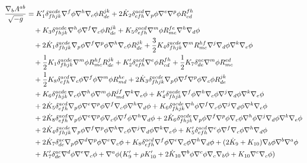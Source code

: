 \begin{equation}\label{nabla-A}
\begin{split}
  \frac{\nabla_b A^{ab}}{\sqrt{-g}}&=K_1'\delta^{acde}_{fhjk}\nabla^f\phi \nabla^h\nabla_c\phi R^{jk}_{de}+2\dot{K}_2\delta^{acd}_{efh}\nabla_p\phi \nabla^{e}\nabla^p\phi R^{fh}_{cd}\\
  &\quad +K_3\delta^{acde}_{fhjk}\nabla^h\phi \nabla^f\nabla_c\phi R^{jk}_{de}+K_5\delta^{acd}_{efh}\nabla^m\phi R^{fe}_{mc}\nabla^h\nabla_d\phi \\
  &\quad +2\dot{K}_1\delta^{acde}_{fhjk}\nabla_p\phi \nabla^f\nabla^p\phi \nabla^h\nabla_c\phi R^{jk}_{de}+\frac{3}{2}K_4\delta^{acde}_{fhjk}\nabla^mR^{hf}_{mc}\nabla^j\nabla_d\phi \nabla^k\nabla_e\phi \\
  &\quad +\frac{1}{2}K_1\delta^{acde}_{fhjk}\nabla^m\phi R^{hf}_{mc}R^{jk}_{de}+K_2'\delta^{acd}_{efh}\nabla^{e}\phi R^{fh}_{cd}+\frac{1}{2}K_7\delta^{ac}_{de}\nabla^m\phi R^{ed}_{mc}\\
  &\quad +\frac{1}{2}K_8\delta^{acd}_{efh}\nabla_c\phi \nabla^f\phi \nabla^m\phi R^{he}_{md}+2\dot{K}_3\delta^{acde}_{fhjk}\nabla_p\phi \nabla^f\nabla^p\phi \nabla_c\phi R^{jk}_{de}\\
  &\quad +K_6\delta^{acde}_{fhjk}\nabla_c\phi \nabla^h\phi \nabla^m\phi R^{jf}_{md}\nabla^k\nabla_e\phi +K_4'\delta^{acde}_{fhjk}\nabla^f\phi\nabla^h\nabla_c\phi \nabla^j\nabla_d\phi \nabla^k\nabla_e\phi \\
  &\quad +2\dot{K}_5\delta^{acd}_{efh}\nabla_p\phi \nabla^{e}\nabla^p\phi \nabla^f\nabla_c\phi \nabla^h\nabla_d\phi +K_6\delta^{acde}_{fhjk}\nabla^h\phi \nabla^f\nabla_c\phi \nabla^j\nabla_d\phi \nabla^k\nabla_e\phi \\
  &\quad +2\dot{K}_8\delta^{acd}_{efh}\nabla_p\phi \nabla^{e}\nabla^p\phi \nabla_c\phi\nabla^f\phi\nabla^h\nabla_d\phi +2\dot{K}_6\delta^{acde}_{fhjk}\nabla_p\phi \nabla^f\nabla^p\phi \nabla_c\phi \nabla^h\phi \nabla^j\nabla_d\phi\nabla^k\nabla_e\phi \\
  &\quad +2\dot{K}_4\delta^{acde}_{fhjk}\nabla_p\phi \nabla^f\nabla^p\phi \nabla^h\nabla_c\phi \nabla^j\nabla_d\phi \nabla^k\nabla_e\phi +K_5'\delta^{acd}_{efh}\nabla^{e}\phi \nabla^f\nabla_c\phi \nabla^h\nabla_d\phi \\
  &\quad +2\dot{K}_7\delta^{ac}_{de}\nabla_p\phi \nabla^d\nabla^p\phi \nabla^{e}\nabla_c\phi +K_8\delta^{acd}_{efh}\nabla^f\phi\nabla^{e}\nabla_c\phi \nabla^h\nabla_d\phi +(2\dot{K}_9+K_{10})\nabla_b\phi \nabla^b\nabla^{a}\phi \\
  &\quad+ K_7'\delta^{ac}_{de}\nabla^d\phi \nabla^{e}\nabla_c\phi +\nabla^{a}\phi (K_9'+\rho K_{10}'+2\dot{K}_{10}\nabla^b\phi \nabla^c\phi \nabla_c\nabla_b\phi +K_{10}\nabla^c\nabla_c\phi )
\end{split}
\end{equation}

